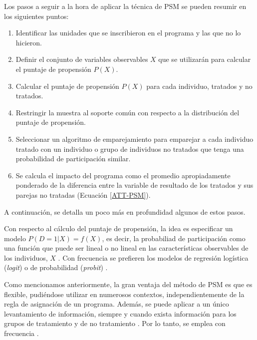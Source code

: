 \documentclass[../../main.tex]{subfiles}
\begin{document}
Los pasos a seguir a la hora de aplicar la técnica de PSM se pueden resumir en los
siguientes puntos:
\begin{enumerate}
    \item Identificar las unidades que se inscribieron en el programa y las que no lo
    hicieron.
    \item Definir el conjunto de variables observables \(X\) que se utilizarán para
    calcular el puntaje de propensión \(P(X)\).
    \item Calcular el puntaje de propensión \(P(X)\) para cada individuo, tratados
    y no tratados.
    \item Restringir la muestra al soporte común con respecto a la distribución
    del puntaje de propensión.
    \item Seleccionar un algoritmo de emparejamiento para emparejar a cada individuo
    tratado con un individuo o grupo de individuos no tratados que tenga una probabilidad
    de participación similar.
    \item Se calcula el impacto del programa como el promedio apropiadamente
    ponderado de la diferencia entre la variable de resultado de los tratados y
    sus parejas no tratadas (Ecuación \ref{ATT-PSM}).
\end{enumerate}
A continuación, se detalla un poco más en profundidad algunos de estos pasos.



Con respecto al cálculo del puntaje de propensión, la idea es especificar un modelo
\(P(D=1|X) = f(X)\), es decir, la probabiliad de participación como una función
que puede ser lineal o no lineal en las características observables de los individuos,
\(X\) \cite{bernal}. Con frecuencia se prefieren los modelos de regresión logística
(\textit{logit}) o de probabilidad (\textit{probit}) \cite{bernal}.



Como mencionamos anteriormente, la gran ventaja del método de PSM es que es flexible,
pudiéndose utilizar en numerosos contextos, independientemente de la regla de asignación
de un programa. Además, se puede aplicar a un único levantamiento de información, siempre
y cuando exista información para los grupos de tratamiento y de no tratamiento
\cite{bernal}. Por lo tanto, se emplea con frecuencia \cite{bernal}.
\end{document}
